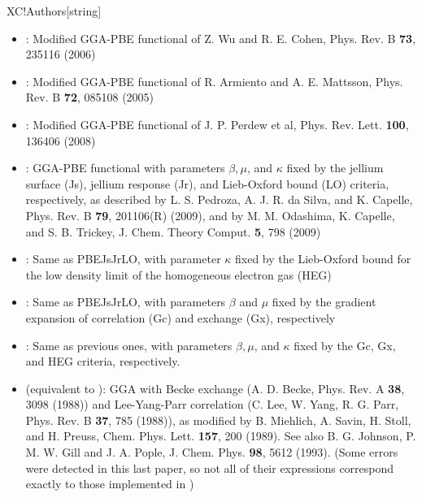 \begin{fdfentry}{XC!Authors}[string]
\begin{itemize}
    \item%
    : %
    Modified GGA-PBE functional of 
    Z. Wu and R. E. Cohen, Phys. Rev. B \textbf{73}, 235116 (2006)

    \item%
    : %
    Modified GGA-PBE functional of 
    R. Armiento and A. E. Mattsson, Phys. Rev. B \textbf{72}, 085108 (2005)
    
    \item%
    : %
    Modified GGA-PBE functional of 
    J. P. Perdew et al, Phys. Rev. Lett. \textbf{100}, 136406 (2008)

    \item%
    : %
    GGA-PBE functional with parameters $\beta, \mu$, and $\kappa$ fixed by 
    the jellium surface (Js), jellium response (Jr), 
    and Lieb-Oxford bound (LO) criteria, respectively, as described by 
    L. S. Pedroza, A. J. R. da Silva, and K. Capelle, 
    Phys. Rev. B \textbf{79}, 201106(R) (2009), and by 
    M. M. Odashima, K. Capelle, and S. B. Trickey, 
    J. Chem. Theory Comput. \textbf{5}, 798 (2009)

    \item%
    : %
    Same as PBEJsJrLO, with parameter $\kappa$ fixed by the  Lieb-Oxford bound 
    for the low density limit of the homogeneous electron gas (HEG)

    \item%
    : %
    Same as PBEJsJrLO, with parameters $\beta$ and $\mu$ fixed by the 
    gradient expansion of correlation (Gc) and exchange (Gx), respectively
    
    \item%
    : %
    Same as previous ones, with parameters $\beta,\mu$, and $\kappa$ fixed by 
    the Gc, Gx, and HEG criteria, respectively.

    \item%
     (equivalent to ): %
    GGA with Becke exchange (A. D. Becke, Phys. Rev. A \textbf{38}, 3098 (1988)) 
    and Lee-Yang-Parr correlation 
    (C. Lee, W. Yang, R. G. Parr, Phys. Rev. B \textbf{37}, 785 (1988)), 
    as modified by B. Miehlich, A. Savin, H. Stoll, and H. Preuss,
    Chem. Phys. Lett. \textbf{157}, 200 (1989). 
    See also B. G. Johnson, P. M. W. Gill and J. A. Pople,
    J. Chem. Phys. \textbf{98}, 5612 (1993). (Some errors were detected in this
    last paper, so not all of their expressions correspond exactly to those
    implemented in \siesta)


\end{itemize}
\end{fdfentry}
